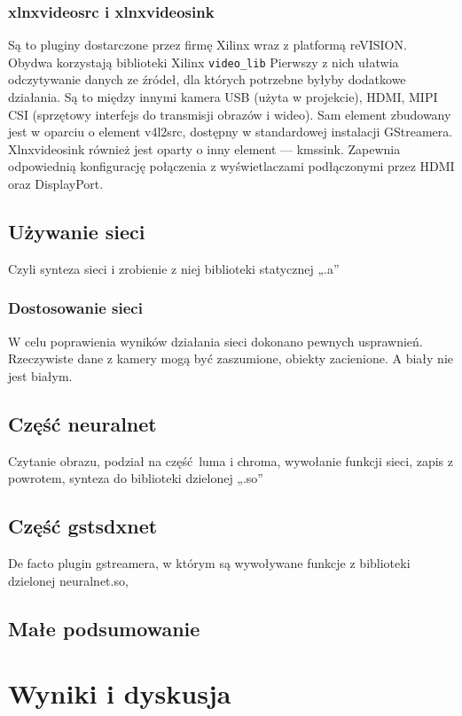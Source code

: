 \documentclass[12pt, oneside]{article}
\begin{document}
\subsubsection{xlnxvideosrc i xlnxvideosink}
Są to pluginy dostarczone przez firmę Xilinx wraz z platformą reVISION.
Obydwa korzystają biblioteki Xilinx \lstinline{video_lib}
Pierwszy z nich ułatwia odczytywanie danych ze źródeł, dla których potrzebne
byłyby dodatkowe działania. Są to między innymi kamera USB (użyta w projekcie),
HDMI, MIPI CSI (sprzętowy interfejs do transmisji obrazów i wideo).
Sam element zbudowany jest w oparciu o element v4l2src, dostępny
w standardowej instalacji GStreamera.
Xlnxvideosink również jest oparty o inny element --- kmssink.
Zapewnia odpowiednią konfigurację połączenia z wyświetlaczami
podłączonymi przez HDMI oraz DisplayPort.


\subsection{Używanie sieci}
Czyli synteza sieci i zrobienie z niej biblioteki statycznej „.a” 
\subsubsection{Dostosowanie sieci}
W celu poprawienia wyników działania sieci dokonano pewnych usprawnień.
Rzeczywiste dane z kamery mogą być zaszumione, obiekty zacienione.
A biały nie jest białym.


\subsection{Część neuralnet}
Czytanie obrazu, podział na część luma i chroma, wywołanie funkcji sieci,
zapis z powrotem, synteza do biblioteki dzielonej „.so”

\subsection{Część gstsdxnet}
De facto plugin gstreamera, w którym są wywoływane funkcje z biblioteki
dzielonej neuralnet.so, 

\subsection{Małe podsumowanie}


\newpage
\section{Wyniki i dyskusja}
\end{document}
